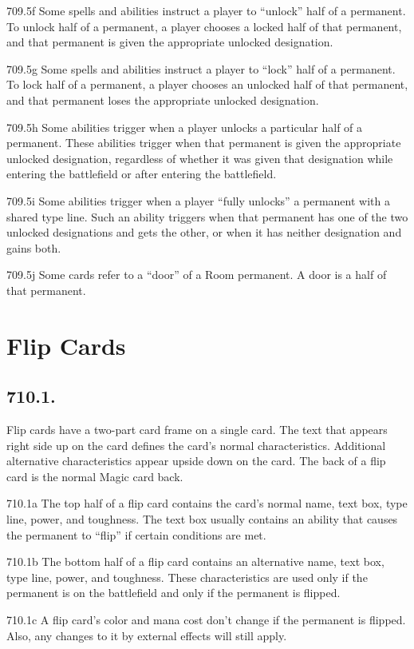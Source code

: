 709.5f Some spells and abilities instruct a player to “unlock” half of a permanent. To unlock half of a permanent, a player chooses a locked half of that permanent, and that permanent is given the appropriate unlocked designation.

709.5g Some spells and abilities instruct a player to “lock” half of a permanent. To lock half of a permanent, a player chooses an unlocked half of that permanent, and that permanent loses the appropriate unlocked designation.

709.5h Some abilities trigger when a player unlocks a particular half of a permanent. These abilities trigger when that permanent is given the appropriate unlocked designation, regardless of whether it was given that designation while entering the battlefield or after entering the battlefield.

709.5i Some abilities trigger when a player “fully unlocks” a permanent with a shared type line. Such an ability triggers when that permanent has one of the two unlocked designations and gets the other, or when it has neither designation and gains both.

709.5j Some cards refer to a “door” of a Room permanent. A door is a half of that permanent.

\section{Flip Cards}
\subsection*{710.1.}
Flip cards have a two-part card frame on a single card. The text that appears right side up on the card defines the card’s normal characteristics. Additional alternative characteristics appear upside down on the card. The back of a flip card is the normal Magic card back.

710.1a The top half of a flip card contains the card’s normal name, text box, type line, power, and toughness. The text box usually contains an ability that causes the permanent to “flip” if certain conditions are met.

710.1b The bottom half of a flip card contains an alternative name, text box, type line, power, and toughness. These characteristics are used only if the permanent is on the battlefield and only if the permanent is flipped.

710.1c A flip card’s color and mana cost don’t change if the permanent is flipped. Also, any changes to it by external effects will still apply.

